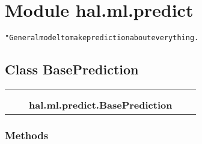 %
%
%


\section{Module hal.ml.predict}

    \label{hal:ml:predict}
\begin{alltt}
" General model to make prediction about everything. 
\end{alltt}



\subsection{Class BasePrediction}

    \label{hal:ml:predict:BasePrediction}
\begin{tabular}{cccccc}
\multicolumn{2}{r}{\settowidth{\BCL}{object}\multirow{2}{\BCL}{object}}
&&
  \\\cline{3-3}
  &&\multicolumn{1}{c|}{}
&&
  \\
&&\multicolumn{2}{l}{\textbf{hal.ml.predict.BasePrediction}}
\end{tabular}



  \subsubsection{Methods}

